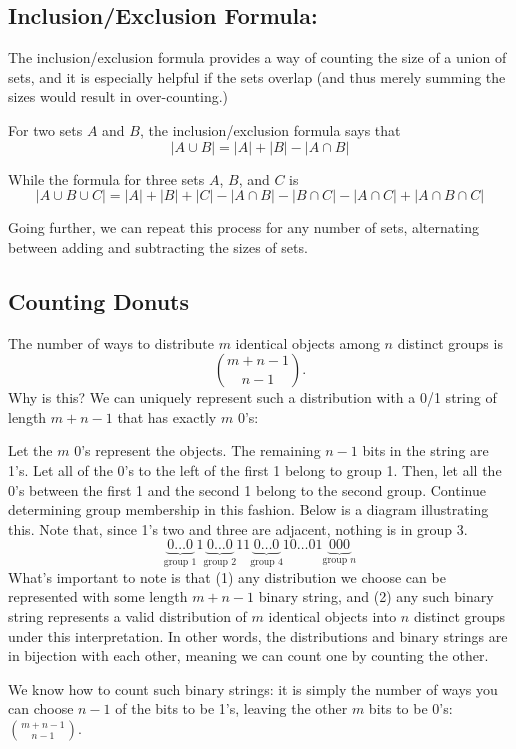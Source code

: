 \documentclass[12pt,letterpaper]{article}
\begin{document}
\subsection{Inclusion/Exclusion Formula:}
The inclusion/exclusion formula provides a way of counting the size of a union of sets, and it is especially helpful if the sets overlap (and thus merely summing the sizes would result in over-counting.)

For two sets $A$ and $B$, the inclusion/exclusion formula says that $$|A \cup B| = |A| + |B| - |A \cap B|$$

While the formula for three sets $A$, $B$, and $C$ is $$|A \cup B \cup C| = |A|+|B|+|C| - |A \cap B| - |B \cap C| - |A \cap C| + |A \cap B \cap C|$$

Going further, we can repeat this process for any number of sets, alternating between adding and subtracting the sizes of sets.

\subsection{Counting Donuts}
The number of ways to distribute $m$ identical objects among $n$ distinct groups is
\[
\binom{m+n-1}{n-1}.
\]
Why is this? We can uniquely represent such a distribution with a 0/1 string of length $m+n-1$ that has exactly $m$ 0's:

Let the $m$ 0's represent the objects. The remaining $n-1$ bits in the string are 1's. Let all of the 0's to the left of the first 1 belong to group 1. Then, let all the 0's between the first 1 and the second 1 belong to the second group. Continue determining group membership in this fashion. Below is a diagram illustrating this. Note that, since 1's two and three are adjacent, nothing is in group 3.
\[
\underbrace{0\ldots0}_\text{group 1}1\underbrace{0\ldots0}_\text{group 2}11\underbrace{0\ldots0}_\text{group 4}10\ldots01\underbrace{000}_\text{group $n$}
\]
What's important to note is that (1) any distribution we choose can be represented with some length $m+n-1$ binary string, and (2) any such binary string represents a valid distribution of $m$ identical objects into $n$ distinct groups under this interpretation. In other words, the distributions and binary strings are in bijection with each other, meaning we can count one by counting the other.

We know how to count such binary strings: it is simply the number of ways you can choose $n-1$ of the bits to be 1's, leaving the other $m$ bits to be 0's: $\binom{m+n-1}{n-1}$.
\end{document}

